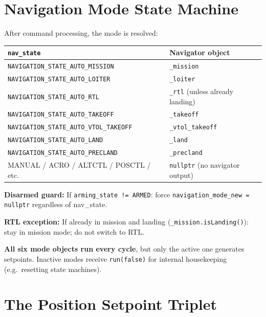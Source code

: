 \documentclass[12pt,a4paper]{article}
\begin{document}
\section{Navigation Mode State Machine}
\label{sec:navmode}

After command processing, the mode is resolved:

\begin{center}\begin{tabular}{ll}\toprule
\texttt{nav\_state} & Navigator object \\\midrule
\texttt{NAVIGATION\_STATE\_AUTO\_MISSION} & \texttt{\_mission} \\
\texttt{NAVIGATION\_STATE\_AUTO\_LOITER} & \texttt{\_loiter} \\
\texttt{NAVIGATION\_STATE\_AUTO\_RTL} & \texttt{\_rtl} (unless already landing) \\
\texttt{NAVIGATION\_STATE\_AUTO\_TAKEOFF} & \texttt{\_takeoff} \\
\texttt{NAVIGATION\_STATE\_AUTO\_VTOL\_TAKEOFF} & \texttt{\_vtol\_takeoff} \\
\texttt{NAVIGATION\_STATE\_AUTO\_LAND} & \texttt{\_land} \\
\texttt{NAVIGATION\_STATE\_AUTO\_PRECLAND} & \texttt{\_precland} \\
MANUAL / ACRO / ALTCTL / POSCTL / etc.\ & \texttt{nullptr} (no navigator output) \\
\bottomrule\end{tabular}\end{center}

\textbf{Disarmed guard:} If \texttt{arming\_state != ARMED}: force
\texttt{navigation\_mode\_new = nullptr} regardless of nav\_state.

\textbf{RTL exception:} If already in mission and landing
(\texttt{\_mission.isLanding()}): stay in mission mode; do not switch to RTL.

\textbf{All six mode objects run every cycle}, but only the active one
generates setpoints. Inactive modes receive \texttt{run(false)} for
internal housekeeping (e.g.\ resetting state machines).

\section{The Position Setpoint Triplet}
\end{document}
